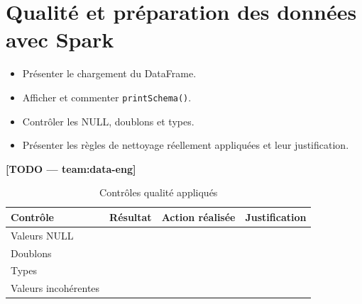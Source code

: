 \section{Qualité et préparation des données avec Spark}
\begin{itemize}
  \item Présenter le chargement du DataFrame.
  \item Afficher et commenter \texttt{printSchema()}.
  \item Contrôler les NULL, doublons et types.
  \item Présenter les règles de nettoyage réellement appliquées et leur justification.
\end{itemize}
\textbf{[TODO — team:data-eng]}

\begin{table}[H]
\centering
\caption{Contrôles qualité appliqués}
\begin{tabular}{llll}
\toprule
Contrôle & Résultat & Action réalisée & Justification \\
\midrule
Valeurs NULL & & & \\
Doublons & & & \\
Types & & & \\
Valeurs incohérentes & & & \\
\bottomrule
\end{tabular}
\end{table}
